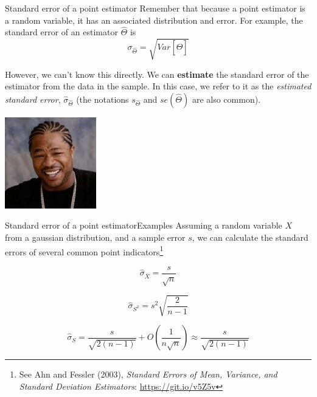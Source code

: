 \begin{frame}{Standard error of a point estimator}
Remember that because a point estimator is a random variable, it has an associated distribution and error. For example, the standard error of an estimator $\hat{\Theta}$ is
\begin{equation*}
\sigma_{\hat{\Theta}} = \sqrt{Var\left[\hat{\Theta}\right]}
\end{equation*}\bigskip

However, we can't know this directly. We can {\bf estimate} the standard error of the estimator from the data in the sample. In this case, we refer to it as the \textit{estimated standard error}, $\hat{\sigma}_{\hat{\Theta}}$ (the notations $s_{\hat{\Theta}}$ and $se(\hat{\Theta})$ are also common).

\hfill\includegraphics[width=.1\textwidth]{../img/yodawg}
\end{frame}

\begin{frame}{Standard error of a point estimator}{Examples}
  Assuming a random variable $X$ from a gaussian distribution, and a sample error $s$, we can calculate the standard errors of several common point indicators\footnote{See Ahn and Fessler (2003), \textit{Standard Errors of Mean, Variance, and Standard Deviation Estimators}: \url{https://git.io/v5Z5v}}

\begin{equation*}
\hat{\sigma}_{\bar{X}} = \frac{s}{\sqrt{n}}
\end{equation*}

\begin{equation*}
\hat{\sigma}_{S^2} = s^2\sqrt{\frac{2}{n-1}}
\end{equation*}

\begin{equation*}
\hat{\sigma}_{S} = \frac{s}{\sqrt{2(n-1)}} + O\left(\frac{1}{n\sqrt{n}}\right)\approx \frac{s}{\sqrt{2(n-1)}}
\end{equation*}\bigskip
\end{frame}

